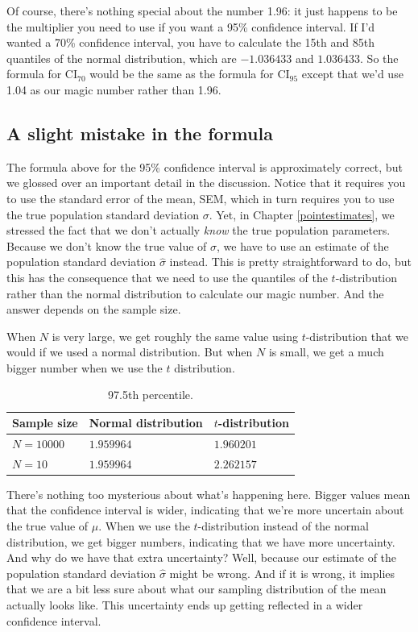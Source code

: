 \documentclass[
  11pt,
  a4paper,
  twoside,symmetric,openright]{book}
\theoremstyle{break}
\theoremstyle{break}
\begin{document}
Of course, there's nothing special about the number 1.96: it just happens to be the multiplier you need to use if you want a 95\% confidence interval. If I'd wanted a 70\% confidence interval, you have to calculate the 15th and 85th quantiles of the normal distribution, which are \(-1.036433\) and \(1.036433\). So the formula for \(\mbox{CI}_{70}\) would be the same as the formula for \(\mbox{CI}_{95}\) except that we'd use 1.04 as our magic number rather than 1.96.

\subsection{A slight mistake in the formula}\label{a-slight-mistake-in-the-formula}

The formula above for the 95\% confidence interval is approximately correct, but we glossed over an important detail in the discussion. Notice that it requires you to use the standard error of the mean, SEM, which in turn requires you to use the true population standard deviation \(\sigma\). Yet, in Chapter \ref{pointestimates}, we stressed the fact that we don't actually \emph{know} the true population parameters. Because we don't know the true value of \(\sigma\), we have to use an estimate of the population standard deviation \(\hat{\sigma}\) instead. This is pretty straightforward to do, but this has the consequence that we need to use the quantiles of the \(t\)-distribution rather than the normal distribution to calculate our magic number. And the answer depends on the sample size.

When \(N\) is very large, we get roughly the same value using \(t\)-distribution that we would if we used a normal distribution. But when \(N\) is small, we get a much bigger number when we use the \(t\) distribution.

\begin{table}

\caption{\label{tab:unnamed-chunk-29}97.5th percentile.}
\centering
\begin{tabular}[t]{lll}
\toprule
Sample size & Normal distribution & $t$-distribution\\
\midrule
$N=10000$ & $1.959964$ & $1.960201$\\
$N=10$ & $1.959964$ & $2.262157$\\
\bottomrule
\end{tabular}
\end{table}

There's nothing too mysterious about what's happening here. Bigger values mean that the confidence interval is wider, indicating that we're more uncertain about the true value of \(\mu\). When we use the \(t\)-distribution instead of the normal distribution, we get bigger numbers, indicating that we have more uncertainty. And why do we have that extra uncertainty? Well, because our estimate of the population standard deviation \(\hat\sigma\) might be wrong. And if it is wrong, it implies that we are a bit less sure about what our sampling distribution of the mean actually looks like. This uncertainty ends up getting reflected in a wider confidence interval.
\end{document}
